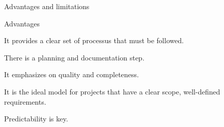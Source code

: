 \begin{frame}{Advantages and limitations}
    \begin{exampleblock}{Advantages}
        \item It provides a clear set of processus that must be followed.
        
        \item There is a planning and documentation step.
        
        \item It emphasizes on quality and completeness.
        
        \item It is the ideal model for projects that have a clear scope, well-defined requirements.
        
        \item Predictability is key.
     
    \end{exampleblock}

\end{frame}
